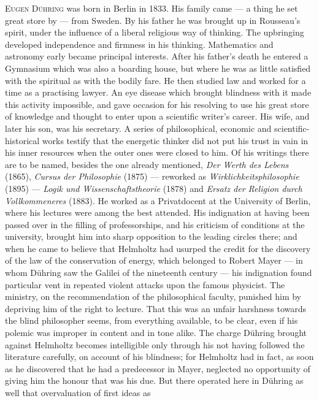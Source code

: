 \documentclass[12pt,a4paper]{book}
\newcommand{\opage}[1]{\marginnote{\footnotesize\textit{[#1]}}}
\begin{document}
\textsc{Eugen Dühring} was born in Berlin in 1833. His family came --- a thing he
set great store by --- from Sweden. By his father he was brought up in Rousseau's
spirit, under the influence of a liberal religious way of thinking. The
upbringing developed independence and firmness in his thinking. Mathematics and
astronomy early became principal interests. After his father's death he entered a
Gymnasium which was also a boarding house, but where he was as little satisfied
with the spiritual as with the bodily fare. He then studied law and worked for a
time as a practising lawyer. An eye disease which brought blindness with it made
this activity impossible, and gave occasion for his resolving to use his great
store of knowledge and thought to enter upon a scientific writer's career. His
wife, and later his son, was his secretary. A series of philosophical, economic
and scientific-historical works testify \opage{556}that the energetic thinker did not put
his trust in vain in his inner resources when the outer ones were closed to him.
Of his writings there are to be named, besides the one already mentioned,
\textit{Der Werth des Lebens} (1865), \textit{Cursus der Philosophie} (1875) ---
reworked as \textit{Wirklichkeitsphilosophie} (1895) --- \textit{Logik und
Wissenschaftstheorie} (1878) and \textit{Ersatz der Religion durch
Vollkommeneres} (1883). He worked as a Privatdocent at the University of Berlin,
where his lectures were among the best attended. His indignation at having been
passed over in the filling of professorships, and his criticism of conditions at
the university, brought him into sharp opposition to the leading circles there;
and when he came to believe that Helmholtz had usurped the credit for the
discovery of the law of the conservation of energy, which belonged to Robert
Mayer --- in whom Dühring saw the Galilei of the nineteenth century --- his
indignation found particular vent in repeated violent attacks upon the famous
physicist. The ministry, on the recommendation of the philosophical faculty,
punished him by depriving him of the right to lecture. That this was an unfair
harshness towards the blind philosopher seems, from everything available, to be
clear, even if his polemic was improper in content and in tone alike. The charge
Dühring brought against Helmholtz becomes intelligible only through his not
having followed the literature carefully, on account of his blindness; for
Helmholtz had in fact, as soon as he discovered that he had a predecessor in
Mayer, neglected no opportunity of giving him the honour that was his due. But
there operated here in Dühring as well that overvaluation of first ideas as
\end{document}
